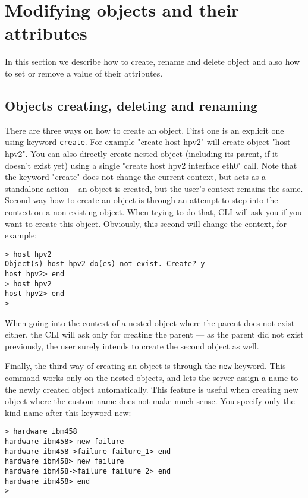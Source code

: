 \documentclass[deska]{subfiles}
\begin{document}
\section{Modifying objects and their attributes}

In this section we describe how to create, rename and delete object and also how to set or remove a value of their
attributes.

\subsection{Objects creating, deleting and renaming}

There are three ways on how to create an object. First one is an explicit one using keyword {\tt create}. For example "create
host hpv2" will create object "host hpv2". You can also directly create nested object (including its parent, if it
doesn't exist yet) using a single "create host hpv2 interface eth0" call. Note that the keyword "create" does not change
the current context, but acts as a standalone action -- an object is created, but the user's context remains the same.
Second way how to create an object is through an attempt to step into the context on a non-existing object.
When trying to do that, CLI will ask you if you want to create this object. Obviously, this second will change the
context, for example:

\begin{verbatim}
> host hpv2
Object(s) host hpv2 do(es) not exist. Create? y
host hpv2> end
> host hpv2
host hpv2> end
>
\end{verbatim}

When going into the context of a nested object where the parent does not exist either, the CLI will ask only for creating the
parent --- as the parent did not exist previously, the user surely intends to create the second object as well.

Finally, the third way of creating an object is through the {\tt new} keyword. This command works only on the nested
objects, and lets the server assign a name to the newly created object automatically. This feature is useful when creating
new object where the custom name does not make much sense. You specify only the kind name after this keyword new:

\begin{verbatim}
> hardware ibm458
hardware ibm458> new failure
hardware ibm458->failure failure_1> end
hardware ibm458> new failure
hardware ibm458->failure failure_2> end
hardware ibm458> end
>
\end{verbatim}
\end{document}
